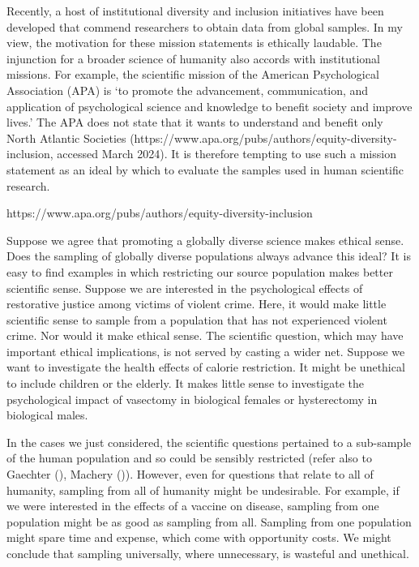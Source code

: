 \documentclass[
  single column]{article}
\begin{document}
Recently, a host of institutional diversity and inclusion initiatives
have been developed that commend researchers to obtain data from global
samples. In my view, the motivation for these mission statements is
ethically laudable. The injunction for a broader science of humanity
also accords with institutional missions. For example, the scientific
mission of the American Psychological Association (APA) is `to promote
the advancement, communication, and application of psychological science
and knowledge to benefit society and improve lives.' The APA does not
state that it wants to understand and benefit only North Atlantic
Societies (https://www.apa.org/pubs/authors/equity-diversity-inclusion,
accessed March 2024). It is therefore tempting to use such a mission
statement as an ideal by which to evaluate the samples used in human
scientific research.

https://www.apa.org/pubs/authors/equity-diversity-inclusion

Suppose we agree that promoting a globally diverse science makes ethical
sense. Does the sampling of globally diverse populations always advance
this ideal? It is easy to find examples in which restricting our source
population makes better scientific sense. Suppose we are interested in
the psychological effects of restorative justice among victims of
violent crime. Here, it would make little scientific sense to sample
from a population that has not experienced violent crime. Nor would it
make ethical sense. The scientific question, which may have important
ethical implications, is not served by casting a wider net. Suppose we
want to investigate the health effects of calorie restriction. It might
be unethical to include children or the elderly. It makes little sense
to investigate the psychological impact of vasectomy in biological
females or hysterectomy in biological males.

In the cases we just considered, the scientific questions pertained to a
sub-sample of the human population and so could be sensibly restricted
(refer also to Gaechter (), Machery
()). However, even for questions that
relate to all of humanity, sampling from all of humanity might be
undesirable. For example, if we were interested in the effects of a
vaccine on disease, sampling from one population might be as good as
sampling from all. Sampling from one population might spare time and
expense, which come with opportunity costs. We might conclude that
sampling universally, where unnecessary, is wasteful and unethical.
\end{document}
